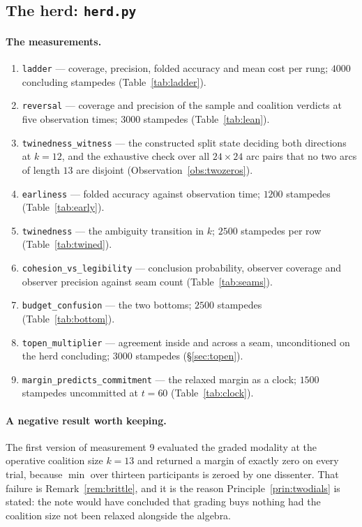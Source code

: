 \documentclass[11pt,a4paper]{article}
\theoremstyle{plain}
\theoremstyle{definition}
\theoremstyle{remark}
\begin{document}
\subsection*{The herd: \texttt{herd.py}}

\paragraph{The measurements.}
\begin{enumerate}[leftmargin=1.6em]
\item \texttt{ladder} --- coverage, precision, folded accuracy and mean cost per
      rung; $4000$ concluding stampedes (Table~\ref{tab:ladder}).
\item \texttt{reversal} --- coverage and precision of the sample and coalition
      verdicts at five observation times; $3000$ stampedes
      (Table~\ref{tab:lean}).
\item \texttt{twinedness\_witness} --- the constructed split state deciding both
      directions at $k = 12$, and the exhaustive check over all $24\times24$ arc
      pairs that no two arcs of length $13$ are disjoint
      (Observation~\ref{obs:twozeros}).
\item \texttt{earliness} --- folded accuracy against observation time;
      $1200$ stampedes (Table~\ref{tab:early}).
\item \texttt{twinedness} --- the ambiguity transition in $k$; $2500$ stampedes
      per row (Table~\ref{tab:twined}).
\item \texttt{cohesion\_vs\_legibility} --- conclusion probability, observer
      coverage and observer precision against seam count
      (Table~\ref{tab:seams}).
\item \texttt{budget\_confusion} --- the two bottoms; $2500$ stampedes
      (Table~\ref{tab:bottom}).
\item \texttt{topen\_multiplier} --- agreement inside and across a seam,
      unconditioned on the herd concluding; $3000$ stampedes
      (\S\ref{sec:topen}).
\item \texttt{margin\_predicts\_commitment} --- the relaxed margin as a clock;
      $1500$ stampedes uncommitted at $t = 60$ (Table~\ref{tab:clock}).
\end{enumerate}

\paragraph{A negative result worth keeping.} The first version of measurement 9
evaluated the graded modality at the operative coalition size $k = 13$ and
returned a margin of exactly zero on every trial, because $\min$ over thirteen
participants is zeroed by one dissenter. That failure is
Remark~\ref{rem:brittle}, and it is the reason Principle~\ref{prin:twodials}
is stated: the note would have concluded that grading buys nothing had the
coalition size not been relaxed alongside the algebra.
\end{document}
